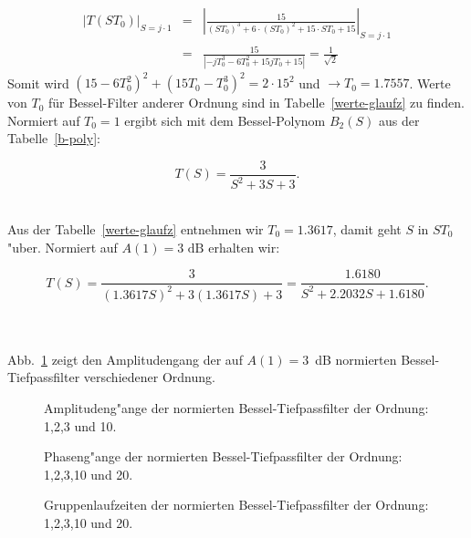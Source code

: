 \begin{eqnarray}
|T(ST_0)|_{S=j\cdot 1}&=&\left|\frac{15}{(ST_0)^3+6\cdot(ST_0)^2+15\cdot ST_0+15} \right|_{S=j\cdot 1}\nonumber \\ 
&=&\frac{15}{\left|-jT_0^3-6T_0^2+15jT_0+15 \right|}=\frac{1}{\sqrt{2}}
\end{eqnarray}
Somit wird $(15-6T_0^2)^2+(15T_0-T_0^3)^2=2\cdot 15^2$ und $\rightarrow T_0=1.7557$. Werte von $T_0$ f\"ur Bessel-Filter anderer Ordnung sind in Tabelle~\ref{werte-glaufz} zu finden.
Normiert auf $T_{0}=1$ ergibt sich mit dem Bessel-Polynom $B_2(S)$ aus der Tabelle~\ref{b-poly}:\\
\parbox[t]{0.7\textwidth}{
\[
T(S)=\frac{3}{S^{2}+3S+3}.
\]
}\\
Aus der Tabelle~\ref{werte-glaufz} entnehmen wir $T_{0}=1.3617$, damit geht $S$ in $ST_{0}$ 
"uber. Normiert auf $A(1)=3\mbox{~dB}$ erhalten wir:\\
\parbox{0.9\textwidth}{
\[
T(S)=\frac{3}{(1.3617S)^{2}+3(1.3617S)+3}=\frac{1.6180}{S^{2}+2.2032S+1.6180}.
\]
}\\
\\
Abb.~\ref{fg-Bessel} zeigt den Amplitudengang der auf $A(1)=3$~dB normierten
Bessel-Tiefpassfilter verschiedener Ordnung.
\begin{figure}[!htb]
\vspace*{-3mm}
\begin{center}
\caption{Amplitudeng"ange der normierten Bessel-Tiefpassfilter der Ordnung: 1,2,3 und 10.\label{fg-Bessel}}
\end{center}
\vspace*{-6mm}
\end{figure}

\begin{figure}[!htb]
\vspace*{-3mm}
\begin{center}
\caption{Phaseng"ange der normierten Bessel-Tiefpassfilter der Ordnung: 1,2,3,10 und 20.}
\end{center}
\vspace*{-6mm}
\end{figure}


\clearpage

\begin{figure}[!htb]
\vspace*{1mm}
\begin{center}
\caption{Gruppenlaufzeiten der normierten Bessel-Tiefpassfilter der Ordnung: 1,2,3,10 und 20.}
\end{center}
\vspace*{-6mm}
\end{figure}

